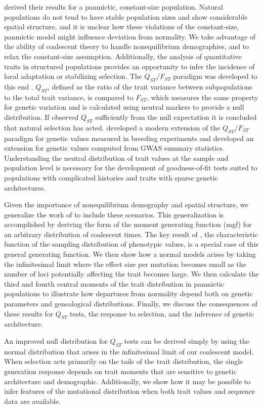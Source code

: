 \citet{Schraiber2015} derived their results for a panmictic, constant-size
population. Natural populations do not tend to have stable population sizes and
show considerable spatial structure, and it is unclear how these violations of
the constant-size, panmictic model might influence deviation from normality. We
take advantage of the ability of coalescent theory to handle nonequilibrium
demographies, and to relax the constant-size assumption. Additionally, the
analysis of quantitative traits in structured populations provides an
opportunity to infer the incidence of local adaptation or stabilizing selection.
The $Q_{ST}$/$F_{ST}$ paradigm was developed to this
end \citep{Whitlock2008,Spitze1993}. $Q_{ST}$, defined as the ratio of the trait
variance between subpopulations to the total trait variance, is compared to
$F_{ST}$, which measures the same property for genetic variation and is
calculated using neutral markers to provide a null distribution. If observed
$Q_{ST}$ sufficiently from the null expectation it is concluded that natural
selection has acted. \citet{Ovaskainen2011} developed a modern extension of the
$Q_{ST}$/$F_{ST}$ paradigm for genetic values measured in breeding experiments
and \citet{Berg2014} developed an extension for genetic values computed from
GWAS summary statistics. Understanding the neutral distribution of trait values
at the sample and population level is necessary for the development of
goodness-of-fit tests suited to populations with complicated histories and
traits with sparse genetic architectures.

Given the importance of nonequilibrium demography and spatial structure, we
generalize the work of \citet{Schraiber2015} to include these scenarios. This
generalization is accomplished by deriving the form of the moment generating
function (mgf) for an arbitrary distribution of coalescent times. The key result
of \citet{Schraiber2015}, the characteristic function of the sampling distribution
of phenotypic values, is a special case of this general generating function. We
then show how a normal models arises by taking the infinitesimal limit where the
effect size per mutation becomes small as the number of loci potentially
affecting the trait becomes large. We then calculate the third and fourth
central moments of the trait distribution in panmictic populations to
illustrate how departures from normality depend both on genetic parameters and
genealogical distributions. Finally, we discuss the consequences of these
results for $Q_{ST}$ tests, the response to selection, and the inference of
genetic architecture.

An improved null distribution for $Q_{ST}$ tests can be derived simply by using
the normal distribution that arises in the infinitesimal limit of our coalescent
model. When selection acts primarily on the tails of the trait distribution, the
single generation response depends on trait moments that are sensitive to
genetic architecture and demographic. Additionally, we show how it may be
possible to infer features of the mutational distribution when both trait values
and sequence data are available.

